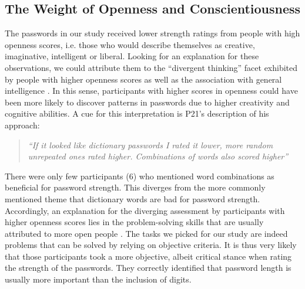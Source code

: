 \subsection{The Weight of Openness and Conscientiousness}
The passwords in our study received lower strength ratings from people with high openness scores, i.e. those who would describe themselves as creative, imaginative, intelligent or liberal. %
Looking for an explanation for these observations, we could attribute them to the ``divergent thinking'' facet exhibited by people with higher openness scores \cite{McCrae1987DivergentThinking} as well as the association with general intelligence \cite{DeYoung2015}. In this sense, participants with higher scores in openness could have been more likely to discover patterns in passwords due to higher creativity and cognitive abilities. A cue for this interpretation is P21's description of his approach: 
\begin{quote}
	\textit{``If it looked like dictionary passwords I rated it lower, more random unrepeated ones rated higher. Combinations of words also scored higher''}
\end{quote}
There were only few participants (6) who mentioned word combinations as beneficial for password strength. This diverges from the more commonly mentioned theme that dictionary words are bad for password strength. Accordingly, an explanation for the diverging assessment by participants with higher openness scores lies in the problem-solving skills that are usually attributed to more open people \cite{DeYoung2015, McCrae1987DivergentThinking}. The tasks we picked for our study are indeed problems that can be solved by relying on objective criteria. It is thus very likely that those participants took a more objective, albeit critical stance when rating the strength of the passwords. They correctly identified that password length is usually more important than the inclusion of digits. 

